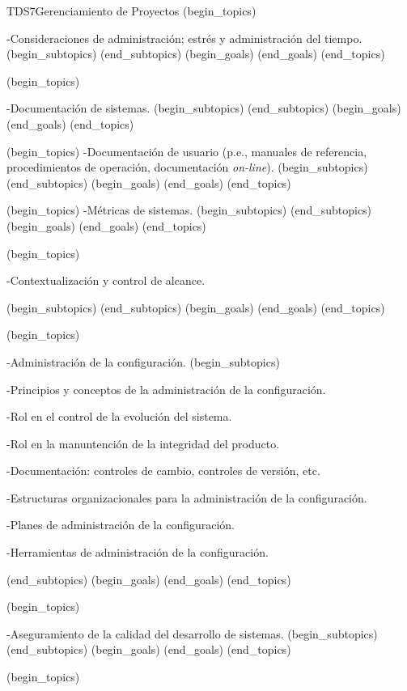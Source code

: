 \begin{BKL2}{TDS7}{Gerenciamiento de Proyectos}
(begin_topics)

-Consideraciones de administración; estrés y administración del tiempo.
(begin_subtopics)
(end_subtopics)
(begin_goals)
(end_goals)
(end_topics)

 

(begin_topics)

-Documentación de sistemas.
(begin_subtopics)
(end_subtopics)
(begin_goals)
(end_goals)
(end_topics)

 

(begin_topics)
-Documentación de usuario (p.e., manuales de referencia, procedimientos de operación, documentación \textit{on-line}).
(begin_subtopics)
(end_subtopics)
(begin_goals)
(end_goals)
(end_topics)

 

(begin_topics)
-Métricas de sistemas.
(begin_subtopics)
(end_subtopics)
(begin_goals)
(end_goals)
(end_topics)

 

(begin_topics)

-Contextualización y control de alcance.

(begin_subtopics)
(end_subtopics)
(begin_goals)
(end_goals)
(end_topics)

 

(begin_topics)

-Administración de la configuración.
(begin_subtopics)

-Principios y conceptos de la administración de la configuración.

-Rol en el control de la evolución del sistema.

-Rol en la manuntención de la integridad del producto.

-Documentación: controles de cambio, controles de versión, etc.

-Estructuras organizacionales para la administración de la configuración.

-Planes de administración de la configuración.

-Herramientas de administración de la configuración.

(end_subtopics)
(begin_goals)
(end_goals)
(end_topics)

 

(begin_topics)

-Aseguramiento de la calidad del desarrollo de sistemas.
(begin_subtopics)
(end_subtopics)
(begin_goals)
(end_goals)
(end_topics)

 

(begin_topics)


\end{BKL2}
